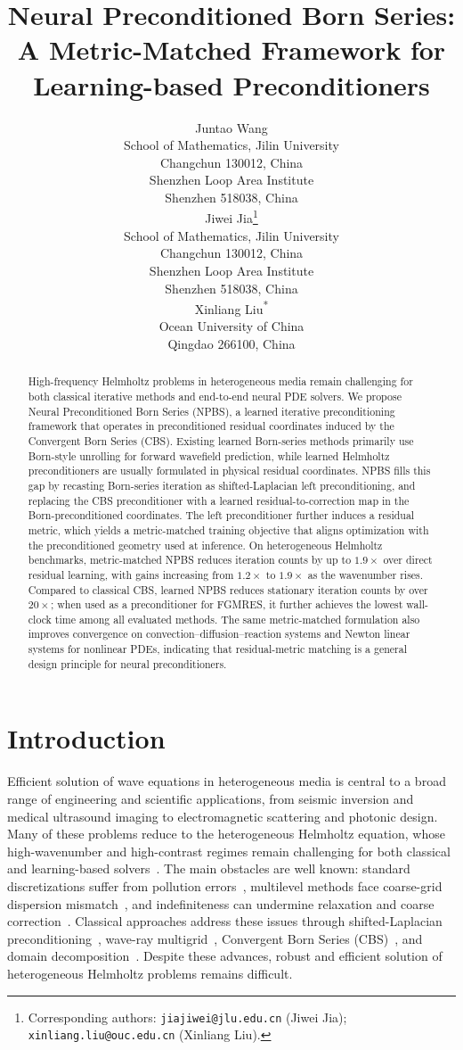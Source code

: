 \documentclass{article}
\title{Neural Preconditioned Born Series: A Metric-Matched Framework for Learning-based Preconditioners}
\author{
  Juntao Wang \\
  School of Mathematics, Jilin University\\
  Changchun 130012, China \\
  Shenzhen Loop Area Institute\\ 
  Shenzhen 518038, China \\
  \And
  Jiwei Jia\thanks{Corresponding authors: \texttt{jiajiwei@jlu.edu.cn} (Jiwei Jia); \texttt{xinliang.liu@ouc.edu.cn} (Xinliang Liu).} \\
  School of Mathematics, Jilin University\\ 
  Changchun 130012, China \\
  Shenzhen Loop Area Institute\\ 
  Shenzhen 518038, China \\
  \And
  Xinliang Liu\textsuperscript{*} \\
  Ocean University of China\\ 
  Qingdao 266100, China
}
\theoremstyle{plain}
\theoremstyle{remark}
\begin{document}
\maketitle


\begin{abstract}
High-frequency Helmholtz problems in heterogeneous media remain challenging for both classical iterative methods and end-to-end neural PDE solvers.
We propose Neural Preconditioned Born Series (NPBS), a learned iterative preconditioning framework that operates in preconditioned residual coordinates induced by the Convergent Born Series (CBS).
Existing learned Born-series methods primarily use Born-style unrolling for forward wavefield prediction, while learned Helmholtz preconditioners are usually formulated in physical residual coordinates.
NPBS fills this gap by recasting Born-series iteration as shifted-Laplacian left preconditioning, and replacing the CBS preconditioner with a learned residual-to-correction map in the Born-preconditioned coordinates.
The left preconditioner further induces a residual metric, which yields a metric-matched training objective that aligns optimization with the preconditioned geometry used at inference.
On heterogeneous Helmholtz benchmarks, metric-matched NPBS reduces iteration counts by up to $1.9\times$ over direct residual learning, with gains increasing from $1.2\times$ to $1.9\times$ as the wavenumber rises.
Compared to classical CBS, learned NPBS reduces stationary iteration counts by over $20\times$; when used as a preconditioner for FGMRES, it further achieves the lowest wall-clock time among all evaluated methods.
The same metric-matched formulation also improves convergence on convection--diffusion--reaction systems and Newton linear systems for nonlinear PDEs, indicating that residual-metric matching is a general design principle for neural preconditioners.
\end{abstract}

\section{Introduction}
Efficient solution of wave equations in heterogeneous media is central to a broad range of engineering and scientific applications, from seismic inversion and medical ultrasound imaging to electromagnetic scattering and photonic design. Many of these problems reduce to the heterogeneous Helmholtz equation, whose high-wavenumber and high-contrast regimes remain challenging for both classical and learning-based solvers~\cite{gander2019class}.
The main obstacles are well known: standard discretizations suffer from pollution errors~\cite{babuska1997pollution}, multilevel methods face coarse-grid dispersion mismatch~\cite{stolk2016dispersion}, and indefiniteness can undermine relaxation and coarse correction~\cite{ernst2011difficult}. Classical approaches address these issues through shifted-Laplacian preconditioning~\cite{erlangga2006novel,erlangga2004class}, wave-ray multigrid~\cite{brandt1997wave}, Convergent Born Series (CBS)~\cite{osnabrugge2016convergent}, and domain decomposition~\cite{chen2013source,graham2020domain}. Despite these advances, robust and efficient solution of heterogeneous Helmholtz problems remains difficult.
\end{document}
